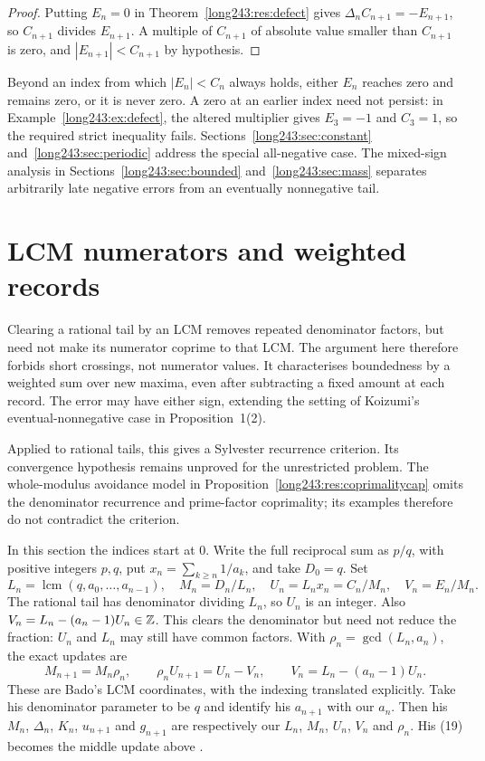\documentclass[11pt]{article}
\begin{document}
\begin{proof}
Putting $E_n=0$ in Theorem~\ref{long243:res:defect} gives
$\Delta_n C_{n+1}=-E_{n+1}$, so $C_{n+1}$ divides $E_{n+1}$.  A multiple of
$C_{n+1}$ of absolute value smaller than $C_{n+1}$ is zero, and
$|E_{n+1}|<C_{n+1}$ by hypothesis.
\end{proof}

Beyond an index from which $|E_n|<C_n$ always holds, either $E_n$
reaches zero and remains zero, or it is never zero. A zero at an earlier
index need not persist: in Example~\ref{long243:ex:defect}, the altered
multiplier gives $E_3=-1$ and $C_3=1$, so the required strict inequality
fails.
Sections~\ref{long243:sec:constant} and~\ref{long243:sec:periodic} address
the special all-negative case. The mixed-sign analysis in
Sections~\ref{long243:sec:bounded} and~\ref{long243:sec:mass} separates
arbitrarily late negative errors from an eventually nonnegative tail.

\section{LCM numerators and weighted records}\label{long243:sec:lcmrecords}

Clearing a rational tail by an LCM removes repeated denominator
factors, but need not make its numerator coprime to that LCM. The
argument here therefore forbids short crossings, not numerator values.
It characterises boundedness by a weighted sum over new maxima, even
after subtracting a fixed amount at each record. The error may have
either sign, extending the setting of Koizumi's eventual-nonnegative
case in Proposition~1(2).

Applied to rational tails, this gives a Sylvester recurrence criterion.
Its convergence hypothesis remains unproved for the unrestricted
problem. The whole-modulus avoidance model in
Proposition~\ref{long243:res:coprimalitycap} omits the denominator
recurrence and prime-factor coprimality; its examples therefore do not
contradict the criterion.

In this section the indices start at $0$. Write the full reciprocal
sum as $p/q$, with positive integers $p,q$, put $x_n=\sum_{k\ge n}1/a_k$, and take
$D_0=q$. Set
\[
 L_n=\operatorname{lcm}(q,a_0,\ldots,a_{n-1}),\quad
 M_n=D_n/L_n,\quad U_n=L_nx_n=C_n/M_n,\quad V_n=E_n/M_n.
\]
The rational tail has denominator dividing $L_n$, so $U_n$ is an integer.
Also $V_n=L_n-(a_n-1)U_n\in\mathbb{Z}$. This clears the denominator but need
not reduce the fraction: $U_n$ and $L_n$ may still have common factors.
With $\rho_n=\gcd(L_n,a_n)$, the exact updates are
\[
 M_{n+1}=M_n\rho_n,\qquad
 \rho_nU_{n+1}=U_n-V_n,\qquad V_n=L_n-(a_n-1)U_n.
\]
These are Bado's LCM coordinates, with the indexing translated explicitly.
Take his denominator parameter to be $q$ and identify his $a_{n+1}$
with our $a_n$. Then his $M_n$, $\Delta_n$, $K_n$, $u_{n+1}$ and
$g_{n+1}$ are respectively our $L_n$, $M_n$, $U_n$, $V_n$ and $\rho_n$.
His (19) becomes the middle update above
\cite[Prop.~7.1 and (16)--(20), pp.~6--7]{bado2026}.
\end{document}
